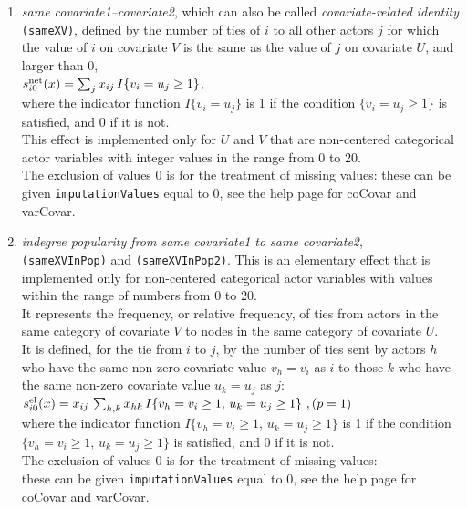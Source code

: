 \documentclass[a4paper,fleqn,11pt]{article}
\newcommand{\+}{\, + \,}
\newcommand{\sfn}[1]{\textsf{#1}}
\newcommand{\vit}{\theenumi}
\newcounter{savenumi}
\begin{document}
\begin{enumerate}
\setcounter{enumi}{\value{savenumi}}

 \item \emph{same covariate1--covariate2}, which can also be called {\em covariate-related identity}
 \texttt{(sameXV)},  defined by the
 number of ties of $i$ to all other actors $j$ for which the value of $i$
 on covariate $V$ is the same as the value of $j$ on covariate $U$,
 and larger than 0,\\[0.3em]
 $s^{\rm net}_{i\vit}(x) = \sum_j x_{ij}\, I\{v_i = u_j \geq 1\} $,\\[0.3em]
 where the indicator function $I\{v_i = u_j \} $ is 1 if the condition $\{v_i = u_j \geq 1\} $
 is satisfied, and 0 if it is not.\\
 This effect is implemented only for $U$ and $V$ that are non-centered categorical
  actor variables with integer values in the range from 0 to 20.\\
  The exclusion of values 0 is for the treatment of missing values:
  these can be given \texttt{imputationValues}  equal to 0,
  see the help page for \sfn{coCovar} and \sfn{varCovar}.

 \item \emph{indegree popularity from same covariate1 to same covariate2},\\
 \texttt{(sameXVInPop)} and \texttt{(sameXVInPop2)}.
  This is an elementary effect that is implemented only for non-centered categorical
  actor variables with values within the range of numbers from 0 to 20.\\
  It represents the frequency, or relative frequency, of ties
  from actors in the
  same category of covariate $V$ to nodes in the same category of covariate $U$.\\
 It is defined, for the tie from $i$ to $j$, by
  the number of ties sent by actors $h$ who have the same non-zero covariate value $v_h = v_i$ as $i$
  to those $k$ who have the same non-zero covariate value $u_k = u_j$ as $j$:\\[0.3em]
 $s^{\rm el}_{i\vit}(x) =  x_{ij}\, \sum_{h,k} x_{hk}\, I\{v_h = v_i \geq 1,\, u_k=u_j \geq 1\}  \ ,
             \hfill (p=1) $\\[0.3em]
 where the indicator function $ I\{v_h = v_i\geq 1,\, u_k=u_j \geq 1 \} $ is 1
 if the condition $\{v_h = v_i \geq 1,\, u_k=u_j \geq 1 \} $ is satisfied, and 0 if it is not.\\
  The exclusion of values 0 is for the treatment of missing values:\\
  these can be given \texttt{imputationValues}  equal to 0,
  see the help page for \sfn{coCovar} and \sfn{varCovar}.


\end{enumerate}
\end{document}
